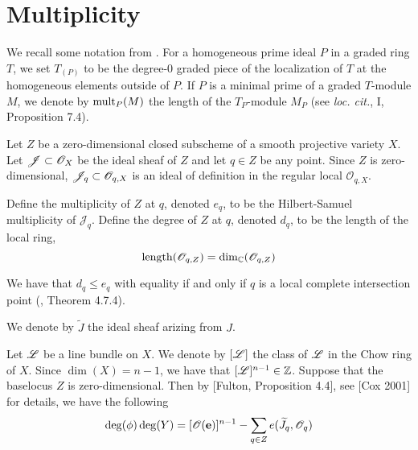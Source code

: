 \documentclass[fleqn,reqno]{amsart}
\numberwithin{first}{chapter}
\begin{document}
\section{Multiplicity}

\begin{paragraf}
\label{par:mult-ha}
We recall some notation from \cite{Har-book-77}. For a homogeneous
prime ideal $P$ in a graded ring $T$, we set $T_{(P)}$ to be the degree-0 graded piece of the localization
of $T$ at the homogeneous elements outside of $P$. If $P$ is a minimal prime of a graded $T$-module
$M$, we denote by $\operatorname{mult}_P(M)$ the length of the $T_P$-module $M_P$ (see {\em loc. cit.}, I, Proposition 7.4).
\end{paragraf}

\begin{paragraf}
\label{par:mult}
Let $Z$ be a zero-dimensional closed subscheme of a smooth projective variety $X$.
Let $\mathscr{J}\subset\mathscr{O}_X$ be the ideal sheaf of $Z$
and let $q\in Z$ be any point.
Since $Z$ is zero-dimensional, $\mathscr{J}_q\subset\mathscr{O}_{q,X}$ is an ideal of definition
in the regular local $\mathscr{O}_{q,X}$.

Define the multiplicity of $Z$ at $q$, denoted $e_q$,
to be the Hilbert-Samuel multiplicity of $\mathscr{J}_q$.
Define the degree of $Z$ at $q$, denoted $d_q$, to be the length of the local ring,
\[	
	\operatorname{length}(\mathscr{O}_{q,Z})=\dim_{\mathbb{C}}(\mathscr{O}_{q,Z})
\]

We have that $d_q\leq e_q$ with equality if and only if $q$ is a local complete intersection
point (\citet{BH-98-CMrings}, Theorem 4.7.4).
\end{paragraf}

\begin{paragraf}
We denote by $\widetilde{J}$ the ideal sheaf arizing from $J$.
\end{paragraf}

\begin{paragraf}
Let $\mathscr{L}$ be a line bundle on $X$.
We denote by $[\mathscr{L}]$ the class of $\mathscr{L}$ in the Chow ring of $X$.
Since $\dim(X)=n-1$, we have that $[\mathscr{L}]^{n-1}\in\mathbb{Z}$.
Suppose that the baselocus $Z$ is zero-dimensional.
Then by [Fulton, Proposition 4.4], see [Cox 2001] for details,
we have the following
\begin{align}
	\label{eq:degree-formula}
	\deg(\phi)\deg(Y)=[\mathscr{O}(\mathbf e)]^{n-1}-\sum_{q\in Z}e(\widetilde{J}_q,\mathscr{O}_q)
\end{align}
\end{paragraf}
\end{document}
